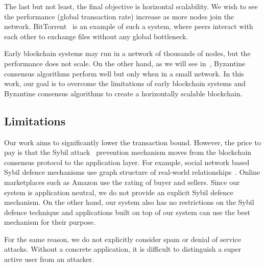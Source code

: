 The last but not least, the final objective is horizontal scalability.
We wish to see the performance (global transaction rate) increase as more nodes join the network.
BitTorrent~\cite{cohen2003incentives} is an example of such a system,
where peers interact with each other to exchange files without any global bottleneck.

Early blockchain systems may run in a network of thousands of nodes, but the performance does not scale.
On the other hand, as we will see in~, Byzantine consensus algorithms perform well but only when in a small network.
In this work, our goal is to overcome the limitations of early blockchain systems and Byzantine consensus algorithms to create a horizontally scalable blockchain.

\subsection{Limitations}
Our work aims to significantly lower the transaction bound.
However, the price to pay is that the Sybil attack~\cite{douceur2002sybil} prevention mechanism moves from the blockchain consensus protocol to the application layer.
For example, social network based Sybil defence mechanisms use graph structure of real-world relationships~\cite{yu2006sybilguard}.
Online marketplaces such as Amazon use the rating of buyer and sellers.
Since our system is application neutral, we do not provide an explicit Sybil defence mechanism.
On the other hand, our system also has no restrictions on the Sybil defence technique
and applications built on top of our system can use the best mechanism for their purpose.

For the same reason, we do not explicitly consider spam or denial of service attacks.
Without a concrete application, it is difficult to distinguish a super active user from an attacker.




